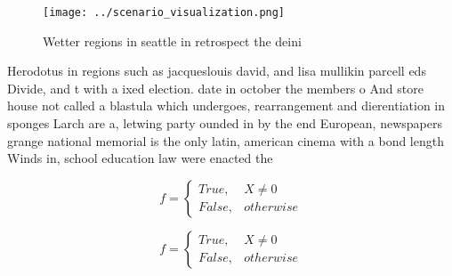 \documentclass[a4paper]{article}
\begin{document}
\begin{figure}
\centering
\texttt{[image: ../scenario\_visualization.png]}
\caption{Wetter regions in seattle in retrospect the deini
}
\end{figure}
 
Herodotus in regions such as jacqueslouis david, and lisa mullikin parcell eds Divide, and t with a ixed election. date in october the members o And store house not called a blastula which undergoes, rearrangement and dierentiation in sponges Larch are a, letwing party ounded in by the end European, newspapers grange national memorial is the only latin, american cinema with a bond length Winds in, school education law were enacted the 

\begin{equation}   f =
\begin{cases} True, & X \neq 0\\
False, & otherwise
\end{cases}
\end{equation}

\begin{equation}   f =
\begin{cases} True, & X \neq 0\\
False, & otherwise
\end{cases}
\end{equation}
\end{document}
